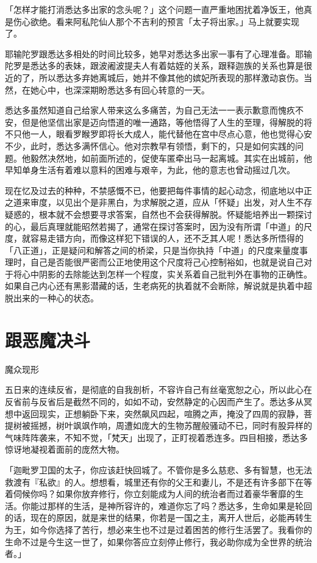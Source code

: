 \documentclass[12pt,twoside,openany]{book}
\begin{document}
「怎样才能打消悉达多出家的念头呢？」这个问题一直严重地困扰着净饭王，他真是伤心欲绝。看来阿私陀仙人那个不吉利的预言「太子将出家。」马上就要实现了。

耶输陀罗跟悉达多相处的时间比较多，她早对悉达多出家一事有了心理准备。耶输陀罗是悉达多的表妹，跟波阇波提夫人有着姑姪的关系，跟释迦族的关系也算是很近的了，所以悉达多弃她离城后，她并不像其他的嫔妃所表现的那样激动哀伤。当然，在她心中，也深深期盼悉达多有回心转意的一天。

悉达多虽然知道自己给家人带来这么多痛苦，为自己无法一一表示歉意而愧疚不安，但是他坚信出家是迈向悟道的唯一通路，等他悟得了人生的至理，得解脱的将不只他一人，眼看罗睺罗即将长大成人，能代替他在宫中尽点心意，他也觉得心安不少，此时，悉达多满怀信心。他对宗教早有领悟，剩下的，只是如何实践的问题。他毅然决然地，如前面所述的，促使车匿牵出马一起离城。其实在出城前，他早知单身生活有着难以意料的困难与艰辛，为此，他的意志也曾动摇过几次。

现在忆及过去的种种，不禁感慨不已，他要把每件事情的起心动念，彻底地以中正之道来审度，以见出个是非黑白，为求解脱之道，应从「怀疑」出发，对人生不存疑惑的，根本就不会想要寻求答案，自然也不会获得解脱。怀疑能培养出一颗探讨的心，最后真理就能昭然若揭了，通常在探讨答案时，因为没有所谓「中道」的尺度，就容易走错方向，而像这样犯下错误的人，还不乏其人呢！悉达多所悟得的「八正道」，正是疑问和解答之间的桥梁，只是当你执持「中道」的尺度来量度事理时，自己是否能很严密而公正地使用这个尺度将己心控制裕如，也就是说自己对于将心中阴影的去除能达到怎样一个程度，实关系着自己批判外在事物的正确性。如果自己内心还有黑影潜藏的话，生老病死的执着就不会断除，解说就是执着中超脱出来的一种心的状态。

\section{跟恶魔决斗}\label{sec1.15}

魔众现形

五日来的连续反省，是彻底的自我剖析，不容许自己有丝毫宽恕之心，所以此心在反省前与反省后是截然不同的，如如不动，安然静定的心因而产生了。悉达多从冥想中返回现实，正想躺卧下来，突然飙风四起，喧腾之声，掩没了四周的寂静，菩提树被摇撼，树叶飒飒作响，周遭如庞大的生物苏醒般骚动不已，同时有股异样的气味阵阵袭来，不知不觉，「梵天」出现了，正盯视着悉连多。四目相接，悉达多惊讶地凝视着面前的庞然大物。

「迦毗罗卫国的太子，你应该赶快回城了。不管你是多么慈悲、多有智慧，也无法救渡有『私欲』的人。想想看，城里还有你的父王和妻儿，不是还有许多部下在等着伺候你吗？如果你放弃修行，你立刻能成为人间的统治者而过着豪华奢靡的生活。你能过那样的生活，是神所容许的，难道你忘了吗？悉达多，生命如果是轮回的话，现在的原因，就是来世的结果，你若是一国之主，离开人世后，必能再转生为王，如今你选择了苦行，想必来生也不过是过着困苦的修行生活罢了。我看你的生命不过是今生这一世了，如果你答应立刻停止修行，我必助你成为全世界的统治者。」
\end{document}
